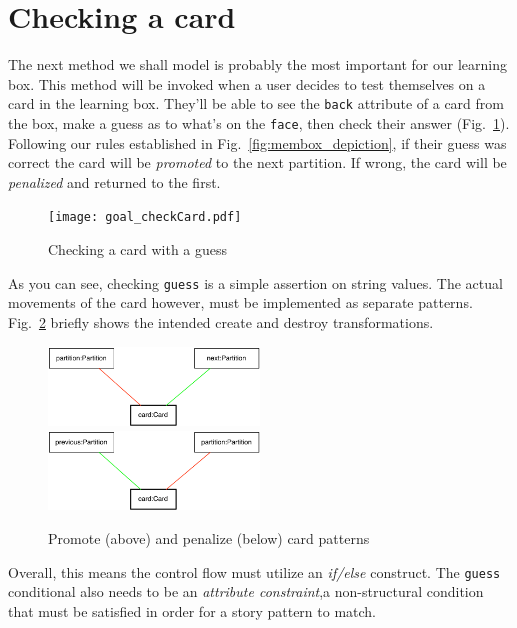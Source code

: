 \newpage
\hypertarget{sec:checkCard}{}
\section{Checking a card}
\genHeader

The next method we shall model is probably the most important for our learning box. This method will be invoked when a user decides to test themselves on a card
in the learning box. They'll be able to see the \texttt{back} attribute of a card from the box, make a guess as to what's on the \texttt{face}, then 
check their answer (Fig.~\ref{fig:goal_check}). Following our rules established in Fig.~\ref{fig:membox_depiction}, if their guess was correct the card will be
\emph{promoted} to the next partition. If wrong, the card will be \emph{penalized} and returned to the first.

\begin{figure}[htbp]
 	\centering
   \texttt{[image: goal\_checkCard.pdf]}
 	\caption{Checking a card with a guess}
 	\label{fig:goal_check}
\end{figure}
\FloatBarrier

As you can see, checking \texttt{guess} is a simple assertion on string values. The actual movements of the card however, must be implemented as separate
patterns. Fig.~\ref{fig:patterns_check} briefly shows the intended create and destroy transformations.

\begin{figure}[htbp]
 	\centering
   \includegraphics[width=0.5\textwidth]{checkCard_promote.pdf}
   \\ \vspace{1cm}
    \includegraphics[width=0.5\textwidth]{checkCard_penalize.pdf}
 	\caption{Promote (above) and penalize (below) card patterns}
 	\label{fig:patterns_check}
\end{figure}
\FloatBarrier

Overall, this means the control flow must utilize an \emph{if/else} construct. The \texttt{guess} conditional also needs to be an \emph{attribute
constraint},a non-structural condition that must be satisfied in order for a story pattern to match. 





